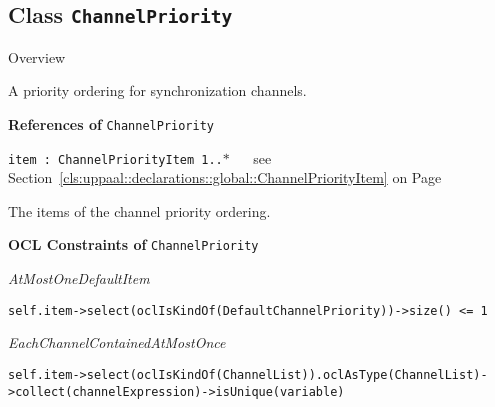 \subsection{Class \bfseries \texttt{ChannelPriority}\normalfont}
\label{cls:uppaal::declarations::global::ChannelPriority} 
	
	\begin{longdescription}
		\item[Overview] 		
				

	

		A priority ordering for synchronization channels.		
		
	
			\item[\textbf{References of} \texttt{ChannelPriority}] ~
			\begin{longdescription}
	\item[\texttt{item : ChannelPriorityItem 	\symbol{"5B}1..$*$\symbol{"5D}
}] ~
	see Section~\ref{cls:uppaal::declarations::global::ChannelPriorityItem} on Page~\pageref{cls:uppaal::declarations::global::ChannelPriorityItem}
	
	\nopagebreak
		
				

	

		The items of the channel priority ordering.		
			\end{longdescription}
			\item[\textbf{OCL Constraints of} \texttt{ChannelPriority}] ~
			\begin{longdescription}
	\item[\small\textit{AtMostOneDefaultItem}] ~ 
	\nopagebreak
	
		\begin{lstlisting}[breaklines=true]
self.item->select(oclIsKindOf(DefaultChannelPriority))->size() <= 1		\end{lstlisting}
	\item[\small\textit{EachChannelContainedAtMostOnce}] ~ 
	\nopagebreak
	
		\begin{lstlisting}[breaklines=true]
self.item->select(oclIsKindOf(ChannelList)).oclAsType(ChannelList)->collect(channelExpression)->isUnique(variable)		\end{lstlisting}
			\end{longdescription}
	
	\end{longdescription}
	

